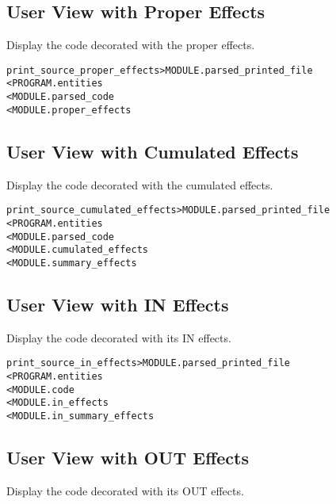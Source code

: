 \documentclass[a4paper]{report}
\newenvironment{PipsMake}{\begin{alltt}}{\end{alltt}}
\newenvironment{PipsPass}[1]{\label{pass:#1}}{}
\begin{document}
\subsection{User View with Proper Effects}

\begin{PipsPass}{print_source_proper_effects}
Display the code decorated with the proper effects.
\end{PipsPass}

\begin{PipsMake}
print_source_proper_effects       > MODULE.parsed_printed_file
        < PROGRAM.entities
        < MODULE.parsed_code
        <  MODULE.proper_effects
\end{PipsMake}

\subsection{User View with Cumulated Effects}

\begin{PipsPass}{print_source_cumulated_effects}
Display the code decorated with the cumulated effects.
\end{PipsPass}

\begin{PipsMake}
print_source_cumulated_effects    > MODULE.parsed_printed_file
        < PROGRAM.entities
        < MODULE.parsed_code
        < MODULE.cumulated_effects
        < MODULE.summary_effects
\end{PipsMake}

\subsection{User View with IN Effects}
\begin{PipsPass}{print_source_in_effects}
Display the code decorated with its IN effects.
\end{PipsPass}

\begin{PipsMake}
print_source_in_effects       > MODULE.parsed_printed_file
        < PROGRAM.entities
        < MODULE.code
        < MODULE.in_effects
        < MODULE.in_summary_effects
\end{PipsMake}

\subsection{User View with OUT Effects}
\begin{PipsPass}{print_source_out_effects}
Display the code decorated with its OUT effects.
\end{PipsPass}
\end{document}
